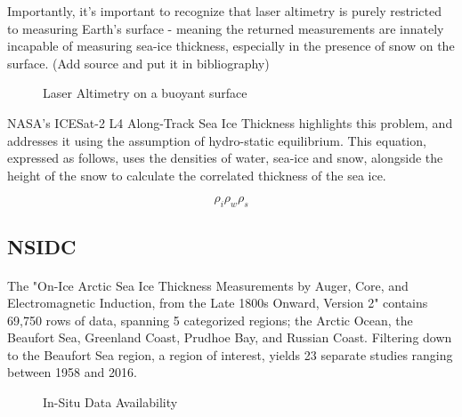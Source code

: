 Importantly, it's important to recognize that laser altimetry is purely restricted to measuring Earth's surface - meaning the returned measurements are innately incapable of measuring sea-ice thickness, especially in the presence of snow on the surface. (Add source and put it in bibliography)
\begin{figure}[htb]
	\centering
	\caption{Laser Altimetry on a buoyant surface} \cite{ICESat-2-L4-Product}
	\label{fig:hydro-static-diagram}
\end{figure}

NASA's ICESat-2 L4 Along-Track Sea Ice Thickness highlights this problem, and addresses it using the assumption of hydro-static equilibrium. This equation, expressed as follows, uses the densities of water, sea-ice and snow, alongside the height of the snow to calculate the correlated thickness of the sea ice.

\begin{equation*}
	\rho_i
	\rho_w
	\rho_s
\end{equation*}


\subsection*{NSIDC}
\paragraph*{}
The "On-Ice Arctic Sea Ice Thickness Measurements by Auger, Core, and Electromagnetic Induction, from the Late 1800s Onward, Version 2" contains 69,750 rows of data, spanning 5 categorized regions; the Arctic Ocean, the Beaufort Sea, Greenland Coast, Prudhoe Bay, and Russian Coast. Filtering down to the Beaufort Sea region, a region of interest, yields 23 separate studies ranging between 1958 and 2016.
\par
\begin{figure}[htb]
	\centering
	\caption{In-Situ Data Availability}
	\label{fig:foobar}
\end{figure}


